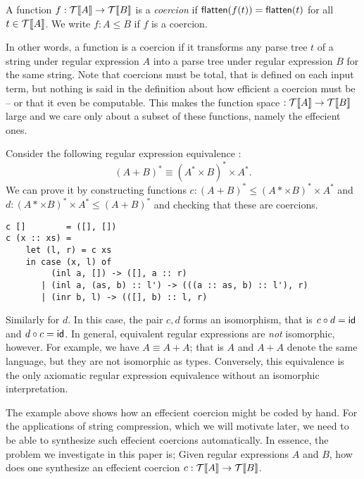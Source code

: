 
\begin{definition}[Coercion]
A function $f :\mathcal{T}\llbracket A \rrbracket \rightarrow \mathcal{T}\llbracket B \rrbracket$ is a \emph{coercion} if $\mathsf{flatten}(f(t)) = \mathsf{flatten}(t)$ for all $t \in \mathcal{T}\llbracket A \rrbracket$.
We write $f : A \leq B$ if $f$ is a coercion.
\end{definition}
In other words, a function is a coercion if it transforms any parse
tree $t$ of a string under regular expression $A$ into a parse tree
under regular expression $B$ for the same string.  Note that coercions
must be total, that is defined on each input term, but nothing is said
in the definition about how efficient a coercion must be -- or that it
even be computable. This makes the function space $:\mathcal{T}\llbracket A \rrbracket
\rightarrow \mathcal{T}\llbracket B \rrbracket$ large and we care only about a subset of these
functions, namely the effecient ones. 



\begin{example}
\label{C11-example}
Consider the following regular expression equivalence \cite[Rule C11, p.~25]{conway71}:
$$(A + B)^* \equiv (A^* \times B)^* \times A^*.$$
We can prove it by constructing functions $c : (A + B)^* \leq (A* \times B)^* \times A^*$ and $d : (A* \times B)^* \times A^* \leq (A + B)^*$
and checking that these are coercions.
\begin{verbatim}
c []        = ([], [])
c (x :: xs) = 
	let (l, r) = c xs
	in case (x, l) of
	     (inl a, []) -> ([], a :: r)
	   | (inl a, (as, b) :: l') -> (((a :: as, b) :: l'), r)
	   | (inr b, l) -> (([], b) :: l, r)
\end{verbatim}
Similarly for $d$.  In this case, the pair $c, d$ forms an isomorphism, that is $c \circ d = \mathsf{id}$ and $d \circ c = \mathsf{id}$.  In general, equivalent regular expressions are \emph{not} isomorphic, however. For example, we have $A \equiv A + A$; that is $A$ and $A + A$ denote the same language, but they are not isomorphic as types. Conversely, this equivalence is the only axiomatic regular expression equivalence without an isomorphic interpretation. 
\end{example}

The example above shows how an effecient coercion might be coded by
hand. For the applications of string compression, which we will
motivate later, we need to be able to synthesize such effecient
coercions automatically. In essence, the problem we investigate in this paper is; Given regular
expressions $A$ and $B$, how does one synthesize an effecient coercion $c :\mathcal{T}\llbracket A \rrbracket
\rightarrow \mathcal{T}\llbracket B \rrbracket$. 

